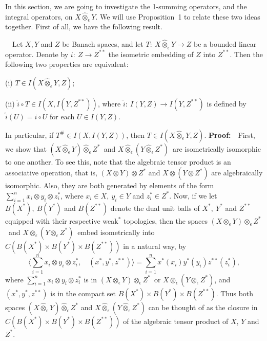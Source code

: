 \medskip

In this section, we are going to investigate the 1-summing operators, 
and the
integral operators, on $X\hat \otimes_\epsilon Y$. We will use 
Proposition~1 to
relate these two ideas together. First of all, we have the following 
result.

\medskip

\ \ Let $X,Y$ and $Z$ be Banach spaces, and 
let
$T:\ X\hat \otimes_\epsilon Y\longrightarrow Z$ be a bounded linear
operator.  Denote by $i:\ Z\longrightarrow Z^{**}$ the isometric
embedding of $Z$ into $Z^{**}$. Then the following two properties are
equivalent:

\item {(i)} $T\in I (X\hat \otimes_\epsilon Y,Z)$;

\item {(ii)} $\hat i \circ T\in I (X, I(Y,Z^{**}))$, where $\hat i:\
I(Y,Z)\longrightarrow I(Y,Z^{**})$ is defined by $\hat i (U)=i\circ U$ 
for
each $U\in I(Y,Z)$.

\noindent In particular, if $T^\#\in I(X, I(Y,Z))$, then $T\in I(X\hat
\otimes_\epsilon Y,Z)$.
\medskip
{\bf Proof:}\ \ First, we show that $(X\hat \otimes_\epsilon Y)\hat
\otimes_\epsilon Z^*$\ and $X\hat \otimes_\epsilon
(Y\hat \otimes_\epsilon Z^*)$\ are isometrically isomorphic to one 
another. To
see this, note that the algebraic tensor product is an associative 
operation,
that is, $(X\otimes Y)\otimes Z^*$ and $X\otimes (Y\otimes Z^*)$ are
algebraically isomorphic. Also, they are both generated by elements of 
the form
$\sum\limits^n_{i=1}x_i\otimes y_i\otimes z_i^*$, where $x_i\in X,\ 
y_i\in Y$
and $z^*_i\in Z^*$. Now, if we let $B(X^*),\ B(Y^*)$ and $B(Z^{**})$ 
denote the
dual unit balls of $X^*,\ Y^*$ and $Z^{**}$ equipped with their 
respective
weak$^{*}$ topologies, then the spaces $(X\otimes_\epsilon 
Y)\otimes_\epsilon
Z^*$\ and $X\otimes_\epsilon (Y\otimes_\epsilon Z^*)$\ embed 
isometrically into
$C\left(B(X^*)\times B(Y^*)\times B(Z^{**})\right)$ in a natural way, 
by
$$
\langle \sum\limits^n_{i=1}x_i\otimes y_i\otimes z_i^*,\quad (x^*, 
y^*,
z^{**})\rangle=
\sum\limits^n_{i=1}x^*(x_i)y^*(y_i)z^{**}(z^*_i) ,
$$
where $\sum\limits^n_{i=1}x_i\otimes y_i\otimes z^*_i$ is in
$(X\otimes_\epsilon Y)\otimes_\epsilon Z^*$\ or 
$X\otimes_\epsilon (Y\otimes_\epsilon Z^*)$, and $(x^*, y^*,
z^{**})$ is in the compact set $B(X^*)\times B(Y^*)\times B(Z^{**})$. 
Thus
both spaces
$(X\hat \otimes_\epsilon Y)\hat \otimes_\epsilon Z^*$ and $X\hat
\otimes_\epsilon (Y\hat \otimes_\epsilon Z^*)$ can be thought of as 
the
closure in $C\left(B(X^*)\times B(Y^*)\times B(Z^{**})\right)$ of the
algebraic tensor product of $X$, $Y$ and $Z^*$.

